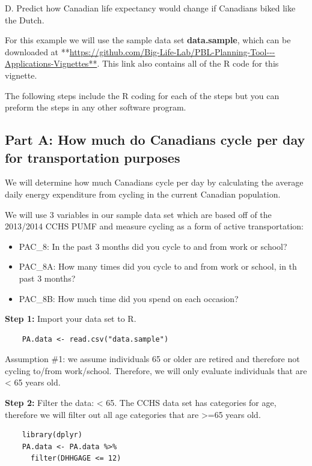 \documentclass[]{book}
\providecommand{\tightlist}{%
  \setlength{\itemsep}{0pt}\setlength{\parskip}{0pt}}
\begin{document}
D. Predict how Canadian life expectancy would change if Canadians biked
like the Dutch.

For this example we will use the sample data set \textbf{data.sample},
which can be downloaded at
**\url{https://github.com/Big-Life-Lab/PBL-Planning-Tool---Applications-Vignettes**}.
This link also contains all of the R code for this vignette.

The following steps include the R coding for each of the steps but you
can preform the steps in any other software program.

\subsection{Part A: How much do Canadians cycle per day for
transportation
purposes}\label{part-a-how-much-do-canadians-cycle-per-day-for-transportation-purposes}

We will determine how much Canadians cycle per day by calculating the
average daily energy expenditure from cycling in the current Canadian
population.

We will use 3 variables in our sample data set which are based off of
the 2013/2014 CCHS PUMF and measure cycling as a form of active
transportation:

\begin{itemize}
\tightlist
\item
  PAC\_8: In the past 3 months did you cycle to and from work or school?
\item
  PAC\_8A: How many times did you cycle to and from work or school, in
  th past 3 months?
\item
  PAC\_8B: How much time did you spend on each occasion?
\end{itemize}

\textbf{Step 1:} Import your data set to R.

\begin{verbatim}
    PA.data <- read.csv("data.sample")
\end{verbatim}

Assumption \#1: we assume individuals 65 or older are retired and
therefore not cycling to/from work/school. Therefore, we will only
evaluate individuals that are \textless{} 65 years old.

\textbf{Step 2:} Filter the data: \textless{} 65. The CCHS data set has
categories for age, therefore we will filter out all age categories that
are \textgreater{}=65 years old.

\begin{verbatim}
    library(dplyr)
    PA.data <- PA.data %>%
      filter(DHHGAGE <= 12)
\end{verbatim}
\end{document}
